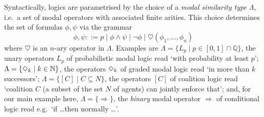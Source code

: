 \documentclass{entcs} \usepackage{entcsmacro}
\newcommand{\hearts}{\heartsuit}
\begin{document}
Syntactically, logics are parametrised by the choice of a \emph{modal
  similarity type} $\Lambda$, i.e.\ a set of modal operators with
associated finite arities. This choice determines the set of formulas
$\phi,\psi$ via the grammar
\begin{equation*}
  \phi, \psi ::=  p \mid
  \phi \land \psi \mid \lnot \phi \mid \hearts(\phi_1, \dots, \phi_n)
\end{equation*}
where $\hearts$ is an $n$-ary operator in $\Lambda$. Examples are
$\Lambda=\{L_p\mid p\in[0,1]\cap\mathbb{Q}\}$, the unary operators
$L_p$ of probabilistic modal logic read `with probability at least
$p$'; $\Lambda=\{\Diamond_{k}\mid k\in{\mathbb{N}}\}$, the operators
$\Diamond_{k}$ of graded modal logic read `in more than $k$
successors'; $\Lambda=\{[C]\mid C\subseteq N\}$, the operators $[C]$
of coalition logic read `coalition $C$ (a subset of the set $N$ of
agents) can jointly enforce that'; and, for our main example here,
$\Lambda=\{\Rightarrow\}$, the \emph{binary} modal operator
$\Rightarrow$ of conditional logic read e.g.\ `if \dots then normally
\dots'.
\end{document}
